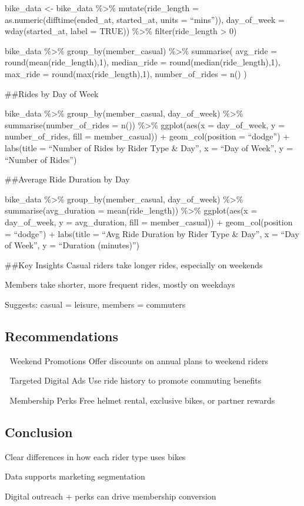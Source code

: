 \documentclass[
]{article}
\begin{document}
bike\_data \textless- bike\_data \%\textgreater\% mutate(ride\_length =
as.numeric(difftime(ended\_at, started\_at, units = ``mins'')),
day\_of\_week = wday(started\_at, label = TRUE)) \%\textgreater\%
filter(ride\_length \textgreater{} 0)

bike\_data \%\textgreater\% group\_by(member\_casual) \%\textgreater\%
summarise( avg\_ride = round(mean(ride\_length),1), median\_ride =
round(median(ride\_length),1), max\_ride = round(max(ride\_length),1),
number\_of\_rides = n() )

\#\#Rides by Day of Week

bike\_data \%\textgreater\% group\_by(member\_casual, day\_of\_week)
\%\textgreater\% summarise(number\_of\_rides = n()) \%\textgreater\%
ggplot(aes(x = day\_of\_week, y = number\_of\_rides, fill =
member\_casual)) + geom\_col(position = ``dodge'') + labs(title =
``Number of Rides by Rider Type \& Day'', x = ``Day of Week'', y =
``Number of Rides'')

\#\#Average Ride Duration by Day

bike\_data \%\textgreater\% group\_by(member\_casual, day\_of\_week)
\%\textgreater\% summarise(avg\_duration = mean(ride\_length))
\%\textgreater\% ggplot(aes(x = day\_of\_week, y = avg\_duration, fill =
member\_casual)) + geom\_col(position = ``dodge'') + labs(title = ``Avg
Ride Duration by Rider Type \& Day'', x = ``Day of Week'', y =
``Duration (minutes)'')

\#\#Key Insights Casual riders take longer rides, especially on weekends

Members take shorter, more frequent rides, mostly on weekdays

Suggests: casual = leisure, members = commuters

\subsection{Recommendations}\label{recommendations}

🎯 Weekend Promotions Offer discounts on annual plans to weekend riders

📱 Targeted Digital Ads Use ride history to promote commuting benefits

🎁 Membership Perks Free helmet rental, exclusive bikes, or partner
rewards

\subsection{Conclusion}\label{conclusion}

Clear differences in how each rider type uses bikes

Data supports marketing segmentation

Digital outreach + perks can drive membership conversion
\end{document}
